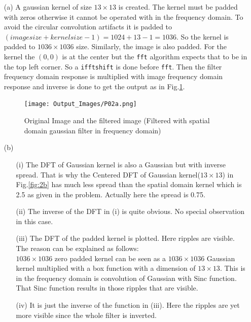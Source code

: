 \documentclass[12pt,a4paper,onecolumn]{exam}
\begin{document}
\begin{solution}
  
  \begin{itemize}
    \item[(a)] A gaussian kernel of size $13 \times 13$ is created. The kernel must be padded with zeros otherwise it cannot be operated with in the frequency domain. To avoid the circular convolution artifacts it is padded to $(image size + kernel size -1) = 1024+13-1 = 1036$. So the kernel is padded to $1036 \times 1036$ size. Similarly, the image is also padded. For the kernel the $(0,0)$ is at the center but the \verb|fft| algorithm expects that to be in the top left corner. So a \verb|ifftshift| is done before \verb|fft|. Then the filter frequency domain response is multiplied with image frequency domain response and inverse is done to get the output as in Fig.\ref{fig:2a}. 
    
        \begin{figure}[H]
        \centering
        \texttt{[image: Output\_Images/P02a.png]}
        \caption{Original Image and the filtered image (Filtered with spatial domain gaussian filter in frequency domain)}
        \label{fig:2a}
        \end{figure}

    \item[(b)] 
    \begin{itemize}
      \item[(i)] The DFT of Gaussian kernel is also a Gaussian but with inverse spread. That is why the Centered DFT of Gaussian kernel($13 \times 13$) in Fig.\ref{fig:2b} has much less spread than the spatial domain kernel which is 2.5 as given in the problem. Actually here the spread is 0.75.
      \item[(ii)] The inverse of the DFT in (i) is quite obvious. No special observation in this case.
      \item[(iii)] The DFT of the padded kernel is plotted. Here ripples are visible. The reason can be explained as follows: \\
         $1036 \times 1036$ zero padded kernel can be seen as a $1036 \times 1036$ Gaussian kernel multiplied with a box function with a dimension of $13 \times 13$. This is in the frequency domain is convolution of Gaussian with Sinc function. That Sinc function results in those ripples that are visible.  
        \item[(iv)] It is just the inverse of the function in (iii). Here the ripples are yet more visible since the whole filter is inverted. 
      \end{itemize}


\end{itemize}
\end{solution}
\end{document}
